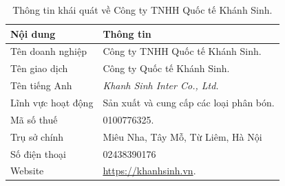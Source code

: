 \begin{table}[H]
  \centering
  \caption{Thông tin khái quát về Công ty TNHH Quốc tế Khánh Sinh.\cite{company-internal-documents}}
  \label{tab:khanh-sinh-company-information}
  \begin{tabular}{p{} p{}}
    \toprule
    Nội dung & Thông tin \\
    \midrule
    Tên doanh nghiệp & Công ty TNHH Quốc tế Khánh Sinh. \\
    Tên giao dịch & Công ty Quốc tế Khánh Sinh. \\
    Tên tiếng Anh & \textit{Khanh Sinh Inter Co., Ltd.} \\
    Lĩnh vực hoạt động & Sản xuất và cung cấp các loại phân bón. \\
    Mã số thuế & 0100776325. \\
    Trụ sở chính & Miêu Nha, Tây Mỗ, Từ Liêm, Hà Nội \\
    Số điện thoại & 02438390176\\
    Website & \url{https://khanhsinh.vn}. \\
    \bottomrule
  \end{tabular}
\end{table}
